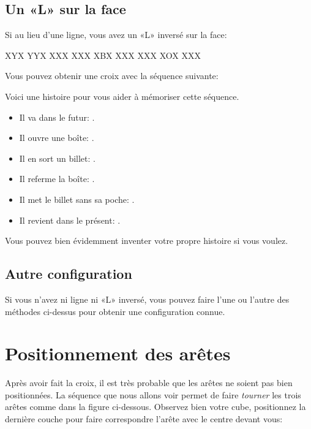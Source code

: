 \subsection{Un «L» sur la face}
\begin{samepage}
Si au lieu d'une ligne, vous avez un «L» inversé sur la face:

\begin{center}	
	\RubikFaceUp%
	{X}{Y}{X}%
	{Y}{Y}{X}%
	{X}{X}{X}
	\RubikFaceRight%
	{X}{X}{X}%
	{X}{B}{X}%
	{X}{X}{X}
	\RubikFaceFront%
	{X}{X}{X}%
	{X}{O}{X}%
	{X}{X}{X}
\end{center}
\end{samepage}
	
Vous pouvez obtenir une croix avec la séquence suivante:


Voici une histoire pour vous aider à mémoriser cette séquence.

\begin{itemize}
	\item Il va dans le futur: .
	\item Il ouvre une boîte: .
	\item Il en sort un billet: .
	\item Il referme la boîte: .
	\item Il met le billet sans sa poche: .
	\item Il revient dans le présent: .
\end{itemize}

Vous pouvez bien évidemment inventer votre propre histoire si vous voulez.

\subsection{Autre configuration}

Si vous n'avez ni ligne ni «L» inversé, vous pouvez faire l'une ou l'autre des méthodes ci-dessus pour obtenir une configuration connue.

\section{Positionnement des arêtes}

Après avoir fait la croix, il est très probable que les arêtes ne soient pas bien positionnées. La séquence que nous allons voir permet de faire \textit{tourner} les trois arêtes comme dans la figure ci-dessous. Observez bien votre cube, positionnez la dernière couche pour faire correspondre l'arête avec le centre devant vous:

